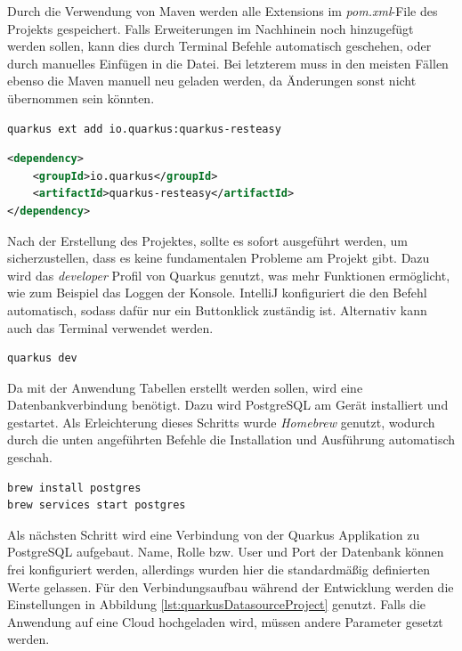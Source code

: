 Durch die Verwendung von Maven werden alle Extensions im \emph{pom.xml}-File des Projekts gespeichert. 
Falls Erweiterungen im Nachhinein noch hinzugefügt werden sollen, kann dies durch Terminal Befehle automatisch geschehen, oder durch manuelles Einfügen in die Datei. 
Bei letzterem muss in den meisten Fällen ebenso die Maven manuell neu geladen werden, da Änderungen sonst nicht übernommen sein könnten. 

\begin{lstlisting}[label=lst:quarkus:mvnextension, language=xml, caption=Quarkus-\gls{cli}-Befehl für RESTEasy Classic]
    quarkus ext add io.quarkus:quarkus-resteasy
\end{lstlisting}

\begin{lstlisting}[label=lst:quarkus:mvnextension, language=xml, caption=Extension RESTEasy Classic in pom.xml]
<dependency>
    <groupId>io.quarkus</groupId>
    <artifactId>quarkus-resteasy</artifactId>
</dependency>
\end{lstlisting}

Nach der Erstellung des Projektes, sollte es sofort ausgeführt werden, um sicherzustellen, dass es keine fundamentalen Probleme am Projekt gibt. 
Dazu wird das \emph{developer} Profil von Quarkus genutzt, was mehr Funktionen ermöglicht, wie zum Beispiel das Loggen der Konsole.
IntelliJ konfiguriert die den Befehl automatisch, sodass dafür nur ein Buttonklick zuständig ist. 
Alternativ kann auch das Terminal verwendet werden. 
\begin{lstlisting}[label=lst:quarkus:devrun, language=bash, caption=Quarkus-\gls{cli}-Befehl zum Starten]
quarkus dev
\end{lstlisting}
 
Da mit der Anwendung Tabellen erstellt werden sollen, wird eine Datenbankverbindung benötigt. 
Dazu wird PostgreSQL am Gerät installiert und gestartet. 
Als Erleichterung dieses Schritts wurde \emph{Homebrew} genutzt, wodurch durch die unten angeführten Befehle die Installation und Ausführung automatisch geschah. 
\begin{lstlisting}[label=lst:quarkus:devrun, language=bash, caption=Homebrew Installation und Ausführung PostgreSQL]
brew install postgres
brew services start postgres
\end{lstlisting}

Als nächsten Schritt wird eine Verbindung von der Quarkus Applikation zu PostgreSQL aufgebaut. 
Name, Rolle bzw. User und Port der Datenbank können frei konfiguriert werden, allerdings wurden hier die standardmäßig definierten Werte gelassen. 
Für den Verbindungsaufbau während der Entwicklung werden die Einstellungen in Abbildung \ref{lst:quarkusDatasourceProject} genutzt. 
Falls die Anwendung auf eine Cloud hochgeladen wird, müssen andere Parameter gesetzt werden.

